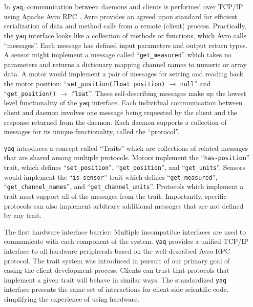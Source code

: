 \documentclass[aip, amsmath, amssymb, reprint,]{revtex4-2}
\newcommand\yaq{\texttt{yaq}}
\begin{document}
In \yaq{}, communication between daemons and clients is performed over TCP/IP using Apache Avro RPC \cite{AvroSpecification}.
Avro provides an agreed upon standard for efficient serialization of data and method calls from a remote (client) process.
Practically, the \yaq{} interface looks like a collection of methods or functions, which Avro calls ``messages''.
Each message has defined input parameters and output return types.
A sensor might implement a message called ``\texttt{get\_measured}'' which takes no parameters and returns a dictionary mapping channel names to numeric or array data.
A motor would implement a pair of messages for setting and reading back the motor position: ``\texttt{set\_position(float position)} $\rightarrow$ \texttt{null}'' and ``\texttt{get\_position()} $\rightarrow$ \texttt{float}''.
These self-describing messages make up the lowest level functionality of the \yaq{} interface.
Each individual communication between client and daemon involves one message being requested by the client and the response returned from the daemon.
Each daemon supports a collection of messages for its unique functionality, called the ``protocol''.

\yaq{} introduces a concept called ``Traits'' which are collections of related messages that are shared among multiple protocols.
Motors implement the ``\texttt{has-position}'' trait, which defines ``\texttt{set\_position}'', ``\texttt{get\_position}'', and ``\texttt{get\_units}''.
Sensors would implement the ``\texttt{is-sensor}'' trait which defines ``\texttt{get\_measured}'', ``\texttt{get\_channel\_names}'', and ``\texttt{get\_channel\_units}''.
Protocols which implement a trait must support all of the messages from the trait.
Importantly, specific protocols can also implement arbitrary additional messages that are not defined by any trait.

The first hardware interface barrier: Multiple incompatible interfaces are used to communicate with each component of the system. %
\yaq{} provides a unified TCP/IP interface to all hardware peripherals based on the well-described Avro RPC protocol.
The trait system was introduced in pursuit of our primary goal of easing the client development process.
Clients can trust that protocols that implement a given trait will behave in similar ways.
The standardized \yaq{} interface presents the same set of interactions for client-side scientific code, simplifying the experience of using hardware.
\end{document}

